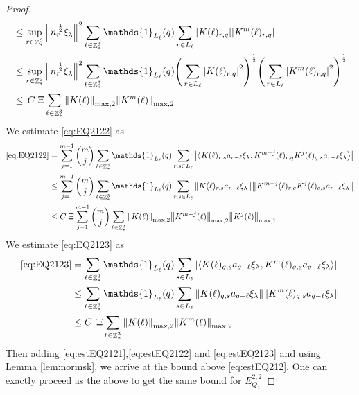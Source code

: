 \documentclass[12pt,a4paper]{article}
\numberwithin{equation}{section}
\newcommand{\1}{\mathbb{I}}
\DeclareMathOperator{\Z}{\mathbb{Z}}
\newcommand{\half}{\frac{1}{2}}
\newcommand{\eva}[1]{\left\langle #1 \right\rangle}
\theoremstyle{plain}
\theoremstyle{definition}
\theoremstyle{remark}
\theoremstyle{plain}
\theoremstyle{definition}
\theoremstyle{remark}
\begin{document}
\begin{proof}
\begin{align}
	&\leq \sup\limits_{r\in \Z^3_*} \norm{n_r^{\,\half}\xi_\lambda}^2 \sum\limits_{\ell \in \Z^3_*} \mathds{1}_{L_{\ell}}(q) \sum\limits_{r\in L_{\ell}} \abs{ K(\ell)_{r,q} } \abs{ K^m(\ell)_{r,q} }\nonumber\\
	&\leq \sup\limits_{r\in \Z^3_*} \norm{n_r^{\,\half}\xi_\lambda}^2 \sum\limits_{\ell \in \Z^3_*} \mathds{1}_{L_{\ell}}(q) \Bigg(\sum\limits_{r\in L_{\ell}} \abs{ K(\ell)_{r,q} }^2\Bigg)^\half \Bigg(\sum\limits_{r\in L_{\ell}}\abs{ K^m(\ell)_{r,q} }^2\Bigg)^\half\nonumber\\
    &\leq \, C\; \Xi \sum\limits_{\ell \in \Z^3_*} \norm{K(\ell)}_{\mathrm{max,2}} \norm{K^m(\ell)}_{\mathrm{max,2}}  \label{eq:estEQ2121}
    \end{align}
We estimate \eqref{eq:EQ2122} as
\begin{align}
     \eqref{eq:EQ2122}
    &=\sum\limits_{j=1}^{m-1} {{m}\choose j} \sum\limits_{\ell \in \Z^3_*}\mathds{1}_{L_{\ell}}(q) \sum\limits_{r,s\in L_{\ell}}  \abs{\eva{ K(\ell)_{r,s} a_{r-\ell}\xi_\lambda, K^{m-j}(\ell)_{r,q} K^{j}(\ell)_{q,s} a_{r-\ell} \xi_\lambda }}\nonumber\\
    &\leq \sum\limits_{j=1}^{m-1} {{m}\choose j} \sum\limits_{\ell \in \Z^3_*}\mathds{1}_{L_{\ell}}(q) \sum\limits_{r,s\in L_{\ell}}  \norm{ K(\ell)_{r,s} a_{r-\ell}\xi_\lambda}\norm{ K^{m-j}(\ell)_{r,q} K^{j}(\ell)_{q,s} a_{r-\ell} \xi_\lambda } \nonumber\\
    &\leq C\;\Xi \sum\limits_{j=1}^{m-1} {{m}\choose j}\sum\limits_{\ell \in \Z^3_*} \norm{K(\ell)}_{\mathrm{max,2}} \norm{K^{m-j}(\ell)}_{\mathrm{max,2}} \norm{K^j(\ell)}_{\mathrm{max,1}} \label{eq:estEQ2122}
    \end{align}
    We estimate \eqref{eq:EQ2123} as 
    \begin{align}
    	\eqref{eq:EQ2123}
    	&=\sum\limits_{\ell \in \Z^3_*} \mathds{1}_{L_{\ell}}(q) \sum\limits_{ s \in L_{\ell}} \abs{\eva{K(\ell)_{q,s} a_{q-\ell} \xi_\lambda, K^m(\ell)_{q,s}  a_{q-\ell} \xi_\lambda }} \nonumber\\
    	&\leq \sum\limits_{\ell \in \Z^3_*} \mathds{1}_{L_{\ell}}(q) \sum\limits_{ s \in L_{\ell}} \norm{K(\ell)_{q,s} a_{q-\ell} \xi_\lambda}\norm{ K^m(\ell)_{q,s}  a_{q-\ell} \xi_\lambda } \nonumber\\
    	&\leq C\; \,\Xi \sum\limits_{\ell \in \Z^3_*} \norm{K(\ell)}_{\mathrm{max,2}} \norm{K^m(\ell)}_{\mathrm{max,2}} \label{eq:estEQ2123}
    \end{align} 
Then adding \eqref{eq:estEQ2121},\eqref{eq:estEQ2122} and \eqref{eq:estEQ2123} and using Lemma \ref{lem:normsk}, we arrive at the bound above \eqref{eq:estEQ212}. One can exactly proceed as the above to get the same bound for $E_{Q_2}^{2,2}$
\end{proof}
\end{document}
